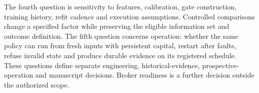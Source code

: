 The fourth question is sensitivity to features, calibration, gate construction, training history, refit cadence and execution assumptions. Controlled comparisons change a specified factor while preserving the eligible information set and outcome definition. The fifth question concerns operation: whether the same policy can run from fresh inputs with persistent capital, restart after faults, refuse invalid state and produce durable evidence on its registered schedule. These questions define separate engineering, historical-evidence, prospective-operation and manuscript decisions. Broker readiness is a further decision outside the authorized scope.
